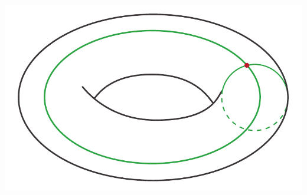 \begin{examples}
\begin{itemize}
		\begin{center}
			\includegraphics[trim=0cm 0cm 0cm 0cm, clip, scale=0.35]{images/torussubdivision.pdf}
		\end{center}
	\end{itemize}
\vspace{-6mm}
\end{examples}
